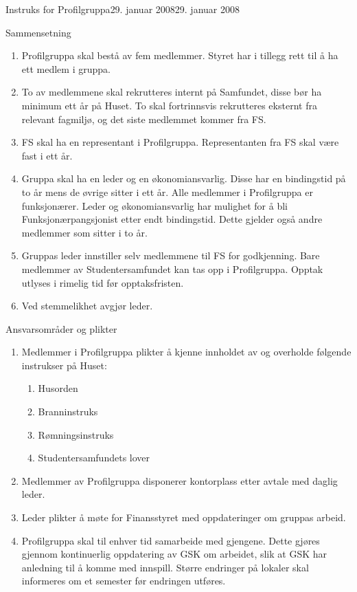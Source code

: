 \documentclass[../fsbok.tex]{subfiles}
\begin{document}
\begin{instruks}{Instruks for Profilgruppa}{29. januar 2008}{29. januar 2008}
    \begin{instruksledd}{Sammensetning}
        \begin{enumerate}
            \item Profilgruppa skal bestå av fem medlemmer. Styret har i tillegg rett til å ha ett medlem i gruppa.
            \item To av medlemmene skal rekrutteres internt på Samfundet, disse bør ha minimum ett år på Huset. To skal
fortrinnsvis rekrutteres eksternt fra relevant fagmiljø, og det siste medlemmet kommer fra FS.
            \item  FS skal ha en representant i Profilgruppa. Representanten fra FS skal være fast i ett år.
            \item Gruppa skal ha en leder og en økonomiansvarlig. Disse har en bindingstid på to år mens de øvrige sitter i ett
år. Alle medlemmer i Profilgruppa er funksjonærer. Leder og økonomiansvarlig har mulighet for å bli
Funksjonærpangsjonist etter endt bindingstid. Dette gjelder også andre medlemmer som sitter i to år.
            \item Gruppas leder innstiller selv medlemmene til FS for godkjenning. Bare medlemmer av Studentersamfundet
kan tas opp i Profilgruppa. Opptak utlyses i rimelig tid før opptaksfristen.
            \item Ved stemmelikhet avgjør leder.
        \end{enumerate}
    \end{instruksledd}

    \begin{instruksledd}{Ansvarsområder og plikter}
        \begin{enumerate}
            \item Medlemmer i Profilgruppa plikter å kjenne innholdet av og overholde følgende instrukser på Huset:
                \begin{enumerate}
                    \item Husorden
                    \item Branninstruks
                    \item Rømningsinstruks
                    \item Studentersamfundets lover
                \end{enumerate}
            \item Medlemmer av Profilgruppa disponerer kontorplass etter avtale med daglig leder.
            \item Leder plikter å møte for Finansstyret med oppdateringer om gruppas arbeid.
            \item Profilgruppa skal til enhver tid samarbeide med gjengene. Dette gjøres gjennom kontinuerlig oppdatering av
GSK om arbeidet, slik at GSK har anledning til å komme med innspill. Større endringer på lokaler skal
informeres om et semester før endringen utføres.
        \end{enumerate}
    \end{instruksledd}


\end{instruks}
\end{document}
